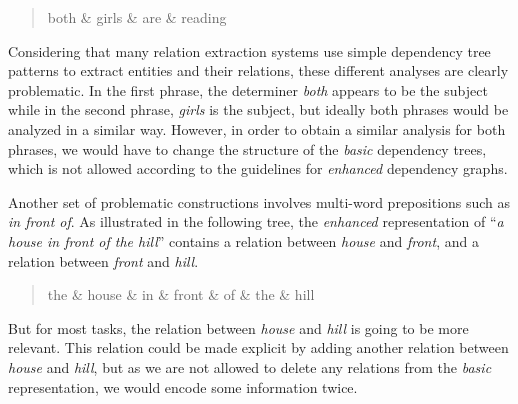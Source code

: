 \documentclass[10pt, a4paper]{article}
\begin{document}
\begin{quote}
\begin{center}
\begin{dependency}[column sep=0.2em, edge unit distance=2.25ex]
  \begin{deptext}
   both \& girls \& are \& reading \\
  \end{deptext}
  
\end{dependency}
\end{center}
\end{quote}

Considering that many relation extraction systems use simple dependency tree patterns to
extract entities and their relations, these different analyses are clearly problematic. In the first
phrase, the determiner \textit{both} appears to be the subject while in the second phrase, 
\textit{girls} is the subject, but ideally both phrases would be analyzed in a similar way.
However, in order to obtain a similar analysis for both phrases, we would have to change
the structure of the \textit{basic} dependency trees, which is not allowed according to 
the guidelines for \textit{enhanced} dependency graphs.

Another set of problematic constructions involves multi-word prepositions 
such as \textit{in front of}. As illustrated in the following tree,
the \textit{enhanced} representation of ``\textit{a house in front of the hill}'' 
contains a relation between  \textit{house} and \textit{front},
and a relation between \textit{front} and \textit{hill}.  

\begin{quote}
\begin{center}
\begin{dependency}[column sep=0.2em, edge unit distance=2.25ex]
  \begin{deptext}
    the \& house \& in \& front \& of \& the \& hill \\
  \end{deptext}
\end{dependency}
\end{center}
\end{quote}

But for most tasks, the relation between  \textit{house} and \textit{hill} is going to 
be more relevant. This relation could be made explicit by adding another 
relation between \textit{house} and \textit{hill}, but as we are not allowed to delete any relations
from the \textit{basic} representation, we would encode some information twice.
\end{document}
